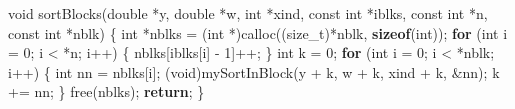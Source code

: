 \documentclass[
  12pt,
  letterpaper,
  DIV=11,
  numbers=noendperiod]{scrreprt}
\newenvironment{Shaded}{\begin{snugshade}}{\end{snugshade}}
\newcommand{\ControlFlowTok}[1]{\textcolor[rgb]{0.00,0.23,0.31}{\textbf{#1}}}
\newcommand{\DataTypeTok}[1]{\textcolor[rgb]{0.68,0.00,0.00}{#1}}
\newcommand{\DecValTok}[1]{\textcolor[rgb]{0.68,0.00,0.00}{#1}}
\newcommand{\KeywordTok}[1]{\textcolor[rgb]{0.00,0.23,0.31}{\textbf{#1}}}
\newcommand{\NormalTok}[1]{\textcolor[rgb]{0.00,0.23,0.31}{#1}}
\newcommand{\OperatorTok}[1]{\textcolor[rgb]{0.37,0.37,0.37}{#1}}
\theoremstyle{remark}
\begin{document}
\begin{Shaded}
\begin{Highlighting}[]
\DataTypeTok{void}\NormalTok{ sortBlocks}\OperatorTok{(}\DataTypeTok{double} \OperatorTok{*}\NormalTok{y}\OperatorTok{,} \DataTypeTok{double} \OperatorTok{*}\NormalTok{w}\OperatorTok{,} \DataTypeTok{int} \OperatorTok{*}\NormalTok{xind}\OperatorTok{,} \DataTypeTok{const} \DataTypeTok{int} \OperatorTok{*}\NormalTok{iblks}\OperatorTok{,} \DataTypeTok{const} \DataTypeTok{int} \OperatorTok{*}\NormalTok{n}\OperatorTok{,}
                \DataTypeTok{const} \DataTypeTok{int} \OperatorTok{*}\NormalTok{nblk}\OperatorTok{)} \OperatorTok{\{}
    \DataTypeTok{int} \OperatorTok{*}\NormalTok{nblks }\OperatorTok{=} \OperatorTok{(}\DataTypeTok{int} \OperatorTok{*)}\NormalTok{calloc}\OperatorTok{((}\DataTypeTok{size\_t}\OperatorTok{)*}\NormalTok{nblk}\OperatorTok{,} \KeywordTok{sizeof}\OperatorTok{(}\DataTypeTok{int}\OperatorTok{));}
    \ControlFlowTok{for} \OperatorTok{(}\DataTypeTok{int}\NormalTok{ i }\OperatorTok{=} \DecValTok{0}\OperatorTok{;}\NormalTok{ i }\OperatorTok{\textless{}} \OperatorTok{*}\NormalTok{n}\OperatorTok{;}\NormalTok{ i}\OperatorTok{++)} \OperatorTok{\{}
\NormalTok{        nblks}\OperatorTok{[}\NormalTok{iblks}\OperatorTok{[}\NormalTok{i}\OperatorTok{]} \OperatorTok{{-}} \DecValTok{1}\OperatorTok{]++;}
    \OperatorTok{\}}
    \DataTypeTok{int}\NormalTok{ k }\OperatorTok{=} \DecValTok{0}\OperatorTok{;}
    \ControlFlowTok{for} \OperatorTok{(}\DataTypeTok{int}\NormalTok{ i }\OperatorTok{=} \DecValTok{0}\OperatorTok{;}\NormalTok{ i }\OperatorTok{\textless{}} \OperatorTok{*}\NormalTok{nblk}\OperatorTok{;}\NormalTok{ i}\OperatorTok{++)} \OperatorTok{\{}
        \DataTypeTok{int}\NormalTok{ nn }\OperatorTok{=}\NormalTok{ nblks}\OperatorTok{[}\NormalTok{i}\OperatorTok{];}
        \OperatorTok{(}\DataTypeTok{void}\OperatorTok{)}\NormalTok{mySortInBlock}\OperatorTok{(}\NormalTok{y }\OperatorTok{+}\NormalTok{ k}\OperatorTok{,}\NormalTok{ w }\OperatorTok{+}\NormalTok{ k}\OperatorTok{,}\NormalTok{ xind }\OperatorTok{+}\NormalTok{ k}\OperatorTok{,} \OperatorTok{\&}\NormalTok{nn}\OperatorTok{);}
\NormalTok{        k }\OperatorTok{+=}\NormalTok{ nn}\OperatorTok{;}
    \OperatorTok{\}}
\NormalTok{    free}\OperatorTok{(}\NormalTok{nblks}\OperatorTok{);}
    \ControlFlowTok{return}\OperatorTok{;}
\OperatorTok{\}}


\end{Highlighting}
\end{Shaded}
\end{document}
